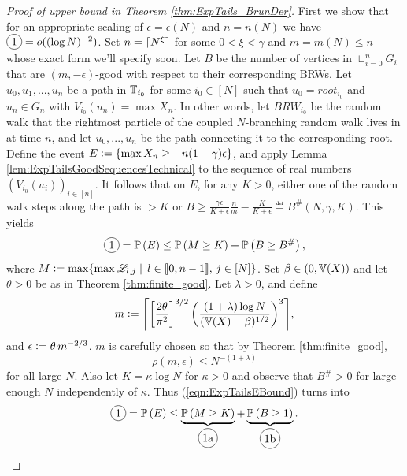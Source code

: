 \begin{proof}[Proof of upper bound in Theorem \ref{thm:ExpTails_BrunDer}]
First we show that for an appropriate scaling of $\epsilon=\epsilon(N)$ and $n = n(N)$ we have $\circled{1} = o((\log N)^{-2})$. Set $n = \lceil N^\xi\rceil$ for some $0 < \xi < \gamma$ and $m = m(N) \leq n$ whose exact form we'll specify soon. Let $B$ be the number of vertices in $\sqcup_{i=0}^n G_i$ that are $(m, - \epsilon)$-good with respect to their corresponding BRWs. Let $u_0, u_1, ..., u_n$ be a path in $\mathbb{T}_{i_0}$ for some $i_0 \in [N]$ such that $u_0 = root_{i_0}$ and $u_n \in G_n$ with $V_{i_0}(u_n) = \max X_n$. In other words, let $BRW_{i_0}$ be the random walk that the rightmost particle of the coupled $N$-branching random walk lives in at time $n$, and let $u_0, ..., u_n$ be the path connecting it to the corresponding root. Define the event $E \vcentcolon= \{ \max X_n \geq - n (1 - \gamma)\epsilon \}$, and apply Lemma \ref{lem:ExpTailsGoodSequencesTechnical} to the sequence of real numbers $(V_{i_0}(u_i))_{i \in [n]}$. It follows that on $E$, for any $K > 0$, either one of the random walk steps along the path is $> K$ or $B \geq \frac{\gamma\epsilon}{K + \epsilon}\frac{n}{m} - \frac{K}{K + \epsilon} \eqdef B^\#(N, \gamma, K)$. This yields
\begin{equation}\label{eqn:ExpTailsEBound}
\circled{1} = \Pr{E} \leq \Pr{M \geq K} + \Pr{B \geq B^\#},  
\end{equation}
where $M \vcentcolon= \max \{\max \mathscr{L}_{l, j} \mid\, l \in \llbracket0, n - 1\rrbracket,\, j \in [N]\}$. Set $\beta \in (0, \mathbb{V}(X))$ and let $\theta > 0$ be as in Theorem \ref{thm:finite_good}. Let $\lambda > 0$, and define 
\begin{equation}\nonumber
m \defeq \ceil*{ \left[\frac{2 \theta}{\pi^2}\right]^{3/2} \left( \frac{(1 + \lambda) \log N}{(\bb{V}(X) - \beta)^{1/2}}\right)^3},
\end{equation} 
and $\epsilon \vcentcolon= \theta\, m^{-2/3}$. $m$ is carefully chosen so that by Theorem \ref{thm:finite_good}, 
\begin{equation}\label{eqn:ExpTailsProof}
\rho(m, \epsilon) \leq N^{-(1 + \lambda)} 
\end{equation}
for all large $N$. Also let $K = \kappa \log N$ for $\kappa > 0$ and observe that $B^\# > 0$ for large enough $N$ independently of $\kappa$. Thus (\ref{eqn:ExpTailsEBound}) turns into
\begin{equation}\nonumber
\circled{1} = \Pr{E} \leq \underbrace{\Pr{M \geq K}}_{\circled{1a}} + \underbrace{\Pr{B \geq 1}}_{\circled{1b}}. 
\end{equation}


\end{proof}
